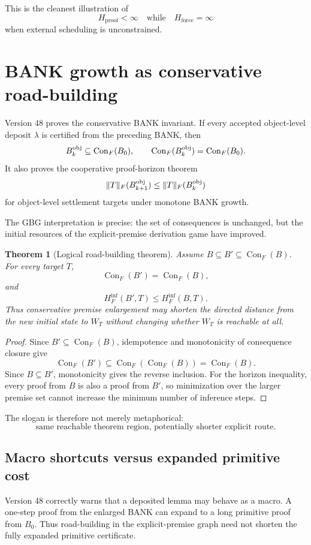 \documentclass[11pt]{article}
\newtheorem{theorem}[definition]{Theorem}
\theoremstyle{remark}
\newcommand{\Con}{\operatorname{Con}}
\begin{document}
This is the cleanest illustration of
\[
\boxed{H_{\mathrm{proof}}<\infty\quad\text{while}\quad H_{\mathrm{force}}=\infty}
\]
when external scheduling is unconstrained.

\section{BANK growth as conservative road-building}

Version 48 proves the conservative BANK invariant. If every accepted object-level deposit $\lambda$ is certified from the preceding BANK, then
\[
B_k^{\rm obj}\subseteq\Con_F(B_0),
\qquad
\Con_F(B_k^{\rm obj})=\Con_F(B_0).
\]
It also proves the cooperative proof-horizon theorem
\[
\|T\|_F(B_{k+1}^{\rm obj})\le \|T\|_F(B_k^{\rm obj})
\]
for object-level settlement targets under monotone BANK growth.

The GBG interpretation is precise: the set of consequences is unchanged, but the initial resources of the explicit-premise derivation game have improved.

\begin{theorem}[Logical road-building theorem]
Assume $B\subseteq B'\subseteq\Con_F(B)$. For every target $T$,
\[
\Con_F(B')=\Con_F(B),
\]
and
\[
H_F^{\mathrm{inf}}(B',T)\le H_F^{\mathrm{inf}}(B,T).
\]
Thus conservative premise enlargement may shorten the directed distance from the new initial state to $W_T$ without changing whether $W_T$ is reachable at all.
\end{theorem}

\begin{proof}
Since $B'\subseteq\Con_F(B)$, idempotence and monotonicity of consequence closure give
\[
\Con_F(B')\subseteq\Con_F(\Con_F(B))=\Con_F(B).
\]
Since $B\subseteq B'$, monotonicity gives the reverse inclusion. For the horizon inequality, every proof from $B$ is also a proof from $B'$, so minimization over the larger premise set cannot increase the minimum number of inference steps.
\end{proof}

The slogan is therefore not merely metaphorical:
\[
\boxed{\text{same reachable theorem region, potentially shorter explicit route}.}
\]

\subsection{Macro shortcuts versus expanded primitive cost}

Version 48 correctly warns that a deposited lemma may behave as a macro. A one-step proof from the enlarged BANK can expand to a long primitive proof from $B_0$. Thus road-building in the explicit-premise graph need not shorten the fully expanded primitive certificate.
\end{document}
